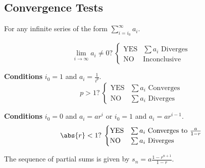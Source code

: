 \documentclass{article}
\begin{document}
\subsection{Convergence Tests}
For any infinite series of the form \(\displaystyle\sum_{i=i_0}^\infty a_i\).
\begin{multicols}{2}
    \begin{tcolorboxcols}[title={Divergence Test}]
        \begin{equation*}
            \text{\(\lim_{i\to\infty}a_i\neq0\)?}\:
            \begin{cases}
                \text{YES} & \text{\(\sum a_i\) Diverges} \\
                \text{NO}  & \text{Inconclusive}
            \end{cases}
        \end{equation*}
    \end{tcolorboxcols}
    \begin{tcolorboxcols}[title={\(p\)-Series}]
        \textbf{Conditions} \(i_0=1\) and \(a_i = \frac{1}{i^p}\).
        \begin{equation*}
            \text{\(p>1\)?}\:
            \begin{cases}
                \text{YES} & \text{\(\sum a_i\) Converges} \\
                \text{NO}  & \text{\(\sum a_i\) Diverges}
            \end{cases}
        \end{equation*}
    \end{tcolorboxcols}
    \begin{tcolorboxcols}[title={Geometric Series}]
        \textbf{Conditions} \(i_0=0\) and \(a_i = a r^i\) or \(i_0=1\) and \(a_i = a r^{i-1}\).
        \begin{equation*}
            \text{\(\abs{r}<1\)?}\:
            \begin{cases}
                \text{YES} & \text{\(\sum a_i\) Converges to \(\frac{a}{1-r}\)} \\
                \text{NO}  & \text{\(\sum a_i\) Diverges}
            \end{cases}
        \end{equation*}
    \end{tcolorboxcols}
    \begin{note}
        The sequence of partial sums is given by \(\displaystyle s_n=a\frac{1-r^{n+1}}{1-r}\).
    \end{note}
    \begin{tcolorboxcols}[title={Alternating Series}]

\end{tcolorboxcols}
\end{multicols}
\end{document}
